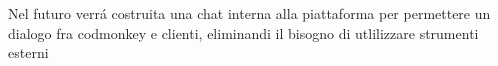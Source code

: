 \begin{center}
    Nel futuro verrá costruita una chat interna alla piattaforma per permettere un dialogo fra codmonkey e clienti, eliminandi il bisogno di utlilizzare strumenti esterni
\end{center}